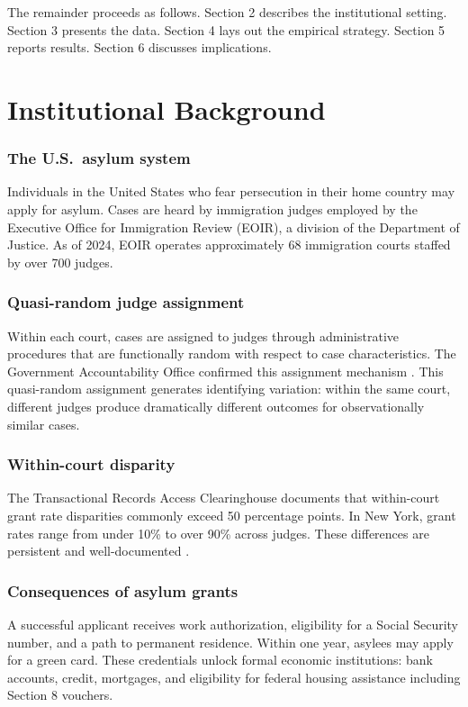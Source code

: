 \documentclass[12pt]{article}
\begin{document}
The remainder proceeds as follows. Section 2 describes the institutional setting. Section 3 presents the data. Section 4 lays out the empirical strategy. Section 5 reports results. Section 6 discusses implications.


\section{Institutional Background}

\subsubsection*{The U.S.\ asylum system} Individuals in the United States who fear persecution in their home country may apply for asylum. Cases are heard by immigration judges employed by the Executive Office for Immigration Review (EOIR), a division of the Department of Justice. As of 2024, EOIR operates approximately 68 immigration courts staffed by over 700 judges.

\subsubsection*{Quasi-random judge assignment} Within each court, cases are assigned to judges through administrative procedures that are functionally random with respect to case characteristics. The Government Accountability Office confirmed this assignment mechanism \citep{gao2008,gao2017}. This quasi-random assignment generates identifying variation: within the same court, different judges produce dramatically different outcomes for observationally similar cases.

\subsubsection*{Within-court disparity} The Transactional Records Access Clearinghouse documents that within-court grant rate disparities commonly exceed 50 percentage points. In New York, grant rates range from under 10\% to over 90\% across judges. These differences are persistent and well-documented \citep{ramji2003,schoenholtz2014}.

\subsubsection*{Consequences of asylum grants} A successful applicant receives work authorization, eligibility for a Social Security number, and a path to permanent residence. Within one year, asylees may apply for a green card. These credentials unlock formal economic institutions: bank accounts, credit, mortgages, and eligibility for federal housing assistance including Section 8 vouchers.
\end{document}

